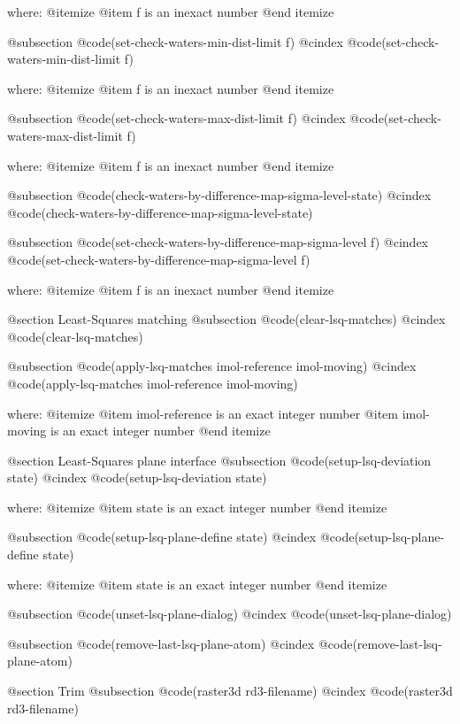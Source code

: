 where: 
 @itemize 
     @item f is an inexact number
 @end itemize


@subsection @code{(set-check-waters-min-dist-limit f)}
@cindex @code{(set-check-waters-min-dist-limit f)}
 
where: 
 @itemize 
     @item f is an inexact number
 @end itemize


@subsection @code{(set-check-waters-max-dist-limit f)}
@cindex @code{(set-check-waters-max-dist-limit f)}
 
where: 
 @itemize 
     @item f is an inexact number
 @end itemize


@subsection @code{(check-waters-by-difference-map-sigma-level-state)}
@cindex @code{(check-waters-by-difference-map-sigma-level-state)}
 
@subsection @code{(set-check-waters-by-difference-map-sigma-level f)}
@cindex @code{(set-check-waters-by-difference-map-sigma-level f)}
 
where: 
 @itemize 
     @item f is an inexact number
 @end itemize



@section Least-Squares matching 
@subsection @code{(clear-lsq-matches)}
@cindex @code{(clear-lsq-matches)}
 
@subsection @code{(apply-lsq-matches imol-reference imol-moving)}
@cindex @code{(apply-lsq-matches imol-reference imol-moving)}
 
where: 
 @itemize 
     @item imol-reference is an exact integer number
     @item imol-moving is an exact integer number
 @end itemize



@section Least-Squares plane interface 
@subsection @code{(setup-lsq-deviation state)}
@cindex @code{(setup-lsq-deviation state)}
 
where: 
 @itemize 
     @item state is an exact integer number
 @end itemize


@subsection @code{(setup-lsq-plane-define state)}
@cindex @code{(setup-lsq-plane-define state)}
 
where: 
 @itemize 
     @item state is an exact integer number
 @end itemize


@subsection @code{(unset-lsq-plane-dialog)}
@cindex @code{(unset-lsq-plane-dialog)}
 
@subsection @code{(remove-last-lsq-plane-atom)}
@cindex @code{(remove-last-lsq-plane-atom)}
 

@section Trim 
@subsection @code{(raster3d rd3-filename)}
@cindex @code{(raster3d rd3-filename)}
 
